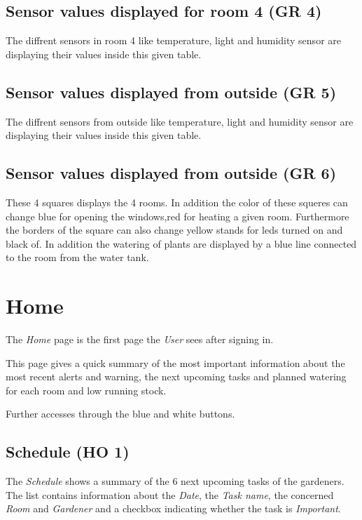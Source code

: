 \subsection{Sensor values displayed for room 4 (GR 4)}
The diffrent sensors in room 4 like temperature, light and humidity sensor are
displaying their values inside this given table.

\subsection{Sensor values displayed from outside (GR 5)}
The diffrent sensors from outside like temperature, light and humidity sensor
are displaying their values inside this given table.

\subsection{Sensor values displayed from outside (GR 6)}
These 4 squares displays the 4 rooms. In addition the color of these squeres can
change blue for opening the windows,red for heating a given room. Furthermore
the borders of the square can also change yellow stands for leds turned on and
black of. In addition the watering of plants are displayed by a blue line
connected to the room from the water tank.



\newpage
\section{Home}
\label{sec:appendix_Home}
\mbox{} \par
\noindent{}

The \emph{Home} page is the first page the \emph{User} sees after signing in.

This page gives a quick summary of the most important information about the most
recent alerts and warning, the next upcoming tasks and planned watering for each
room and low running stock. 

Further accesses through the blue and white buttons.

\subsection{Schedule (HO 1)}
The \emph{Schedule} shows a summary of the 6 next upcoming tasks of the
gardeners. The list contains information about the \emph{Date}, the \emph{Task
name}, the concerned \emph{Room} and \emph{Gardener} and a checkbox indicating
whether the task is \emph{Important}.

